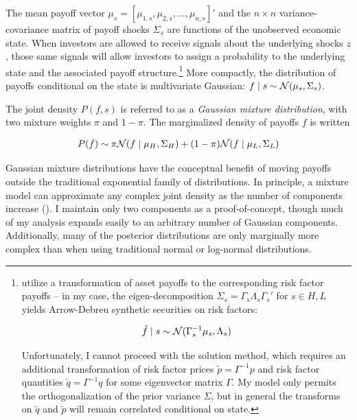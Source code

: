 \documentclass{article}
\begin{document}
The mean payoff vector $\mu_s = [\mu_{1,s},\mu_{2,s},\dots,\mu_{n,s}]'$ and the  $n\times n$ variance-covariance matrix of payoff shocks $\Sigma_s$ are functions of the unobserved economic state. When investors are allowed to receive signals about the underlying shocks $z$, those same signals will allow investors to assign a probability to the underlying state and the associated payoff structure.\footnote{\textcite{kacperczyk_rational_2016} utilize a transformation of asset payoffs to the corresponding risk factor payoffs -- in my case, the eigen-decomposition $\Sigma_s = \Gamma_s \Lambda_s \Gamma_s'$ for $s \in {H,L}$ yields Arrow-Debreu synthetic securities on risk factors:

\begin{align}
    \tilde f \mid s \sim \mathcal{N}(\Gamma_s^{-1} \mu_s, \Lambda_s)
\end{align}

\noindent Unfortunately, I cannot proceed with the \textcite{kacperczyk_rational_2016} solution method, which requires an additional transformation of risk factor prices $\tilde p = \Gamma^{-1}p$ and risk factor quantities $\tilde q = \Gamma^{-1} q$ for some eigenvector matrix $\Gamma$. My model only permits the orthogonalization of the prior variance $\Sigma$, but in general the transforms on $\tilde q$ and $\tilde p$ will remain correlated conditional on state.
} More compactly, the distribution of payoffs conditional on the state is multivariate Gaussian: $f \mid s \sim \mathcal{N}(\mu_{s}, \Sigma_s)$.

The joint density $P(f,s)$ is referred to as a \textit{Gaussian mixture distribution}, with two mixture weights $\pi$ and $1-\pi$. The marginalized density of payoffs $f$ is written

\begin{align}
    P(f) \sim \pi \mathcal{N}(f \mid \mu_H, \Sigma_H) + (1-\pi) \mathcal{N} (f \mid \mu_L, \Sigma_L)
\end{align}

\noindent Gaussian mixture distributions have the conceptual benefit of moving payoffs outside the traditional exponential family of distributions. In principle, a mixture model can approximate any complex joint density as the number of components increase (\cite{nguyen_approximations_2019}). I maintain only two components as a proof-of-concept, though much of my analysis expands easily to an arbitrary number of Gaussian components. Additionally, many of the posterior distributions are only marginally more complex than when using traditional normal or log-normal distributions.
\end{document}
